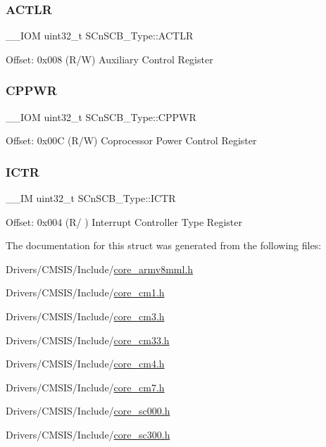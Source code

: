 \subsubsection{\texorpdfstring{ACTLR}{ACTLR}}
{\footnotesize\ttfamily \+\_\+\+\_\+\+I\+OM uint32\+\_\+t S\+Cn\+S\+C\+B\+\_\+\+Type\+::\+A\+C\+T\+LR}

Offset\+: 0x008 (R/W) Auxiliary Control Register \mbox{\label{struct_s_cn_s_c_b___type_a356efebfcbdaecaf1176e6cd86a60bf1}} 
\subsubsection{\texorpdfstring{CPPWR}{CPPWR}}
{\footnotesize\ttfamily \+\_\+\+\_\+\+I\+OM uint32\+\_\+t S\+Cn\+S\+C\+B\+\_\+\+Type\+::\+C\+P\+P\+WR}

Offset\+: 0x00C (R/W) Coprocessor Power Control Register \mbox{\label{struct_s_cn_s_c_b___type_a34ec1d771245eb9bd0e3ec9336949762}} 
\subsubsection{\texorpdfstring{ICTR}{ICTR}}
{\footnotesize\ttfamily \+\_\+\+\_\+\+IM uint32\+\_\+t S\+Cn\+S\+C\+B\+\_\+\+Type\+::\+I\+C\+TR}

Offset\+: 0x004 (R/ ) Interrupt Controller Type Register 

The documentation for this struct was generated from the following files\+:\begin{DoxyCompactItemize}
\item 
Drivers/\+C\+M\+S\+I\+S/\+Include/\mbox{\hyperlink{core__armv8mml_8h}{core\+\_\+armv8mml.\+h}}\item 
Drivers/\+C\+M\+S\+I\+S/\+Include/\mbox{\hyperlink{core__cm1_8h}{core\+\_\+cm1.\+h}}\item 
Drivers/\+C\+M\+S\+I\+S/\+Include/\mbox{\hyperlink{core__cm3_8h}{core\+\_\+cm3.\+h}}\item 
Drivers/\+C\+M\+S\+I\+S/\+Include/\mbox{\hyperlink{core__cm33_8h}{core\+\_\+cm33.\+h}}\item 
Drivers/\+C\+M\+S\+I\+S/\+Include/\mbox{\hyperlink{core__cm4_8h}{core\+\_\+cm4.\+h}}\item 
Drivers/\+C\+M\+S\+I\+S/\+Include/\mbox{\hyperlink{core__cm7_8h}{core\+\_\+cm7.\+h}}\item 
Drivers/\+C\+M\+S\+I\+S/\+Include/\mbox{\hyperlink{core__sc000_8h}{core\+\_\+sc000.\+h}}\item 
Drivers/\+C\+M\+S\+I\+S/\+Include/\mbox{\hyperlink{core__sc300_8h}{core\+\_\+sc300.\+h}}\end{DoxyCompactItemize}
